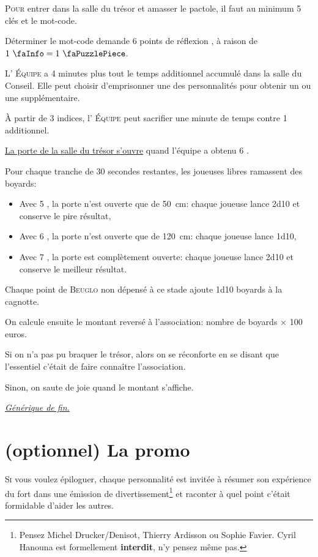 \documentclass[french,twocolumn,twoside]{article}
\newcommand\equipe{{\fontspec{Serpentine Medium} \textsc{Équipe}}\xspace}
\newcommand\gueulo{{\Fontlukas\large\textsc{Beuglo}}\xspace}
\begin{document}
\lettrine{P}{our} entrer dans la salle du trésor et amasser le pactole, il faut au minimum 5 clés {\faKey} et le mot-code.

Déterminer le mot-code demande 6 points de réflexion {\faPuzzlePiece}, à raison de $1~\text{\faInfo} = 1~\text{\faPuzzlePiece}$.

L'\equipe a 4 minutes plus tout le temps additionnel accumulé dans la salle du Conseil. Elle peut choisir d'emprisonner une des personnalités pour obtenir un {\faInfo} ou une {\faKey} supplémentaire.

À partir de 3 indices, l'\equipe peut sacrifier une minute de temps contre 1 {\faPuzzlePiece} additionnel.

\href{https://youtu.be/tHu4Kd_eel0}{La porte de la salle du trésor s'ouvre} quand l'équipe a obtenu 6 {\faPuzzlePiece}.

Pour chaque tranche de 30 secondes restantes, les joueuses libres ramassent des boyards:
\begin{itemize}
	\item[\ding{223}] Avec 5 {\faKey}, la porte n'est ouverte que de \SI{50}{\centi\meter}: chaque joueuse lance 2d10 et conserve le pire résultat,
	\item[\ding{224}] Avec 6 {\faKey}, la porte n'est ouverte que de \SI{120}{\centi\meter}: chaque joueuse lance 1d10,
	\item[\ding{225}] Avec 7 {\faKey}, la porte est complètement ouverte: chaque joueuse lance 2d10 et conserve le meilleur résultat.
\end{itemize}

Chaque point de \gueulo non dépensé à ce stade ajoute 1d10 boyards à la cagnotte.

On calcule ensuite le montant reversé à l'association: nombre de boyards $\times$ 100 euros.

Si on n'a pas pu braquer le trésor, alors on se réconforte en se disant que l'essentiel c'était de faire connaître l'association.

Sinon, on saute de joie quand le montant s'affiche.

\href{https://www.youtube.com/watch?v=BnYDldFEqk4}{\textit{Générique de fin.}}

\section*{(optionnel) La promo}

\lettrine{S}{i} vous voulez épiloguer, chaque personnalité est invitée à résumer son expérience du fort dans une émission de divertissement\footnote{Pensez Michel Drucker/Denisot, Thierry Ardisson ou Sophie Favier. Cyril Hanouna est formellement \textbf{interdit}, n'y pensez même pas.} et raconter à quel point c'était formidable d'aider les autres.
\end{document}
